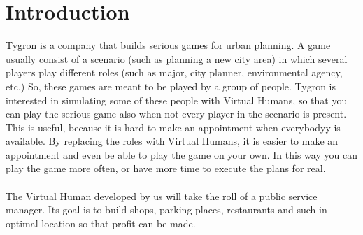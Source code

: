 \section{Introduction}

Tygron is a company that builds serious games for urban planning.
A game usually consist of a scenario (such as planning a new city area) in which several players play different roles (such as major, city planner, environmental agency, etc.)
So, these games are meant to be played by a group of people.
Tygron is interested in simulating some of these people with Virtual Humans, so that you can play the serious game also when not every player in the scenario is present. This is useful, because it is hard to make an appointment when everybodyy is available. By replacing the roles with Virtual Humans, it is easier to make an appointment and even be able to play the game on your own. In this way you can play the game more often, or have more time to execute the plans for real.
\\
\\
The Virtual Human developed by us will take the roll of a public service manager. Its goal is to build shops, parking places, restaurants and such in optimal location so that profit can be made.




\newpage